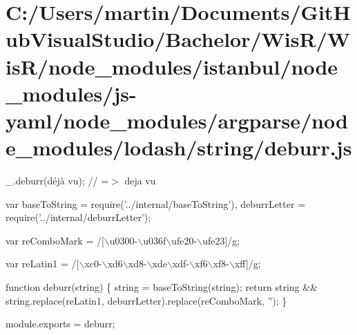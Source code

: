 \hypertarget{_c_1_2_users_2martin_2_documents_2_git_hub_visual_studio_2_bachelor_2_wis_r_2_wis_r_2node_modulef361eb8fc703a26622d106b85f9d3046}{}\section{C\+:/\+Users/martin/\+Documents/\+Git\+Hub\+Visual\+Studio/\+Bachelor/\+Wis\+R/\+Wis\+R/node\+\_\+modules/istanbul/node\+\_\+modules/js-\/yaml/node\+\_\+modules/argparse/node\+\_\+modules/lodash/string/deburr.\+js}
\+\_\+.\+deburr(\textquotesingle{}déjà vu\textquotesingle{}); // =$>$ \textquotesingle{}deja vu\textquotesingle{}


\begin{DoxyCodeInclude}
var baseToString = require(\textcolor{stringliteral}{'../internal/baseToString'}),
    deburrLetter = require(\textcolor{stringliteral}{'../internal/deburrLetter'});

var reComboMark = /[\(\backslash\)u0300-\(\backslash\)u036f\(\backslash\)ufe20-\(\backslash\)ufe23]/g;

var reLatin1 = /[\(\backslash\)xc0-\(\backslash\)xd6\(\backslash\)xd8-\(\backslash\)xde\(\backslash\)xdf-\(\backslash\)xf6\(\backslash\)xf8-\(\backslash\)xff]/g;

\textcolor{keyword}{function} deburr(\textcolor{keywordtype}{string}) \{
  \textcolor{keywordtype}{string} = baseToString(\textcolor{keywordtype}{string});
  \textcolor{keywordflow}{return} \textcolor{keywordtype}{string} && \textcolor{keywordtype}{string}.replace(reLatin1, deburrLetter).replace(reComboMark, \textcolor{stringliteral}{''});
\}

module.exports = deburr;
\end{DoxyCodeInclude}
 
